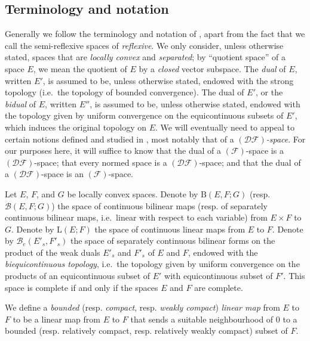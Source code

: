 \documentclass[british]{article}
\newcommand{\oldpage}[1]{\marginpar{\footnotesize$\Big\vert$ \textit{p.~#1}}}
\begin{document}
\subsection*{Terminology and notation}\label{terminology-and-notation}

Generally we follow the terminology and notation of \autocite{3}, apart
from the fact that we call the semi-reflexive spaces of \autocite{3}
\emph{reflexive}. We only consider, unless otherwise stated, spaces that
are \emph{locally convex} and \emph{separated}; by ``quotient space'' of
a space \(E\), we mean the quotient of \(E\) by a \emph{closed} vector
subspace. The \emph{dual} of \(E\), written \(E'\), is assumed to be,
unless otherwise stated, endowed with the strong topology (i.e.~the
topology of bounded convergence). \oldpage{75} The dual of \(E'\), or
the \emph{bidual} of \(E\), written \(E''\), is assumed to be, unless
otherwise stated, endowed with the topology given by uniform convergence
on the equicontinuous subsets of \(E'\), which induces the original
topology on \(E\). We will eventually need to appeal to certain notions
defined and studied in \autocite{6}, most notably that of a
\emph{\((\mathscr{DF})\)-space}. For our purposes here, it will suffice
to know that the dual of a \((\mathscr{F})\)-space is a
\((\mathscr{DF})\)-space; that every normed space is a
\((\mathscr{DF})\)-space; and that the dual of a
\((\mathscr{DF})\)-space is an \((\mathscr{F})\)-space.

Let \(E\), \(F\), and \(G\) be locally convex spaces. Denote by
\(\mathrm{B}(E,F;G)\) (resp. \(\mathscr{B}(E,F;G)\)) the space of
continuous bilinear maps (resp. of separately continuous bilinear maps,
i.e.~linear with respect to each variable) from \(E\times F\) to \(G\).
Denote by \(\mathrm{L}(E;F)\) the space of continuous linear maps from
\(E\) to \(F\). Denote by \(\mathscr{B}_e(E'_s,F'_s)\) the space of
separately continuous bilinear forms on the product of the weak duals
\(E'_s\) and \(F'_s\) of \(E\) and \(F\), endowed with the
\emph{biequicontinuous topology}, i.e.~the topology given by uniform
convergence on the products of an equicontinuous subset of \(E'\) with
equicontinuous subset of \(F'\). This space is complete if and only if
the spaces \(E\) and \(F\) are complete.

We define a \emph{bounded} (resp. \emph{compact}, resp. \emph{weakly
compact}) \emph{linear map} from \(E\) to \(F\) to be a linear map from
\(E\) to \(F\) that sends a suitable neighbourhood of \(0\) to a bounded
(resp. relatively compact, resp. relatively weakly compact) subset of
\(F\).
\end{document}
